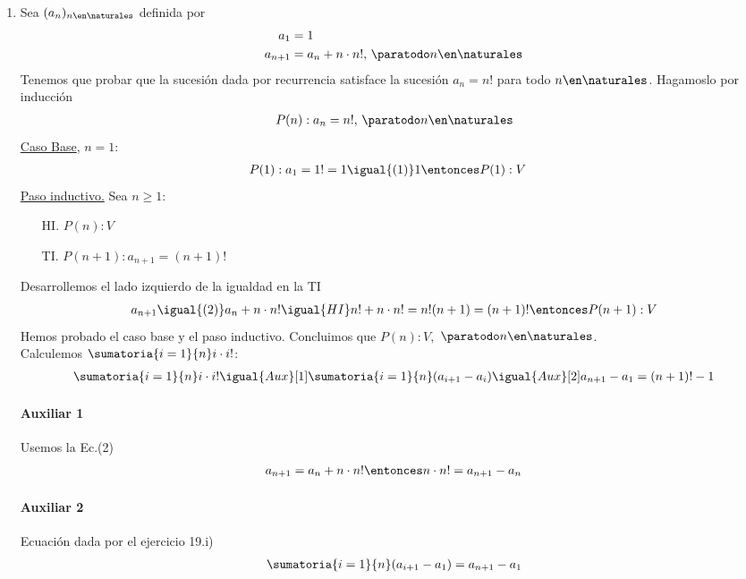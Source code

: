 \begin{enumerate}[label=\roman*)]
    \item Sea $(a_n)_{n \en \naturales }$ definida por
    \setcounter{equation}{0}
    \begin{align}
        a_1 &= 1 \\
        a_{n+1} &= a_n + n \cdot n!,\, \paratodo n \en \naturales 
    \end{align} 
    Tenemos que probar que la sucesión dada por recurrencia satisface la sucesión $a_n = n!$ para todo $n \en 
    \naturales $. 
    Hagamoslo por inducción
    \begin{align*}
        P(n): a_n = n!,\, \paratodo n \en \naturales 
    \end{align*}
    \underline{Caso Base}, $n = 1$:
	    \begin{align*}
		    &P(1): a_1 = 1! = 1 \igual{(1)} 1 \entonces P(1):V
	    \end{align*}
	\underline{Paso inductivo.} Sea $n \geq 1$:
	\begin{enumerate}
        \item[HI.] $P(n): V$
        \item[TI.] $P(n+1): a_{n+1} = (n+1)!$
    \end{enumerate}
 	Desarrollemos el lado izquierdo de la igualdad en la TI
    \begin{align*}
  	    a_{n+1} \igual{(2)} a_n + n \cdot n! \igual{HI} n! + n \cdot n! = n!(n + 1) = (n+1)! 
        \entonces P(n+1):V
    \end{align*}
    Hemos probado el caso base y el paso inductivo. Concluimos que $P(n):V,$ $\paratodo n \en \naturales $.\\

    Calculemos $\displaystyle \sumatoria{i=1}{n} i \cdot i! $:
    \begin{align*}
        \sumatoria{i=1}{n}  i \cdot i!
        \igual{Aux}[1]
        \sumatoria{i=1}{n}  (a_{i+1} - a_i)
        \igual{Aux}[2]
        a_{n+1} - a_1 = (n+1)! - 1
    \end{align*}

    \paragraph{Auxiliar 1}{
        Usemos la Ec.(2)
        \begin{align*}
            a_{n+1} = a_n + n \cdot n! \entonces n \cdot n! = a_{n+1} - a_n
        \end{align*}
    }
    \paragraph{Auxiliar 2}{
        Ecuación dada por el ejercicio 19.i)
        \begin{align*}
            \sumatoria{i=1}{n} (a_{i+1} - a_1) = a_{n+1} - a_1
        \end{align*}
    }


\end{enumerate}
